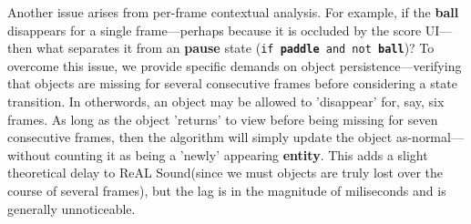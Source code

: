 \documentclass{report}
\newcommand{\rs}{ReAL Sound\xspace}
\newcommand{\state}[1]{\textbf{#1}}
\newcommand{\pad}{\textbf{paddle}\xspace}
\newcommand{\ball}{\textbf{ball}\xspace}
\begin{document}
Another issue arises from per-frame contextual analysis. For example, if the \ball disappears for a single frame---perhaps because it is occluded by the score UI---then what separates it from an \state{pause} state (\texttt{if \pad and not \ball})? To overcome this issue, we provide specific demands on object persistence---verifying that objects are missing for several consecutive frames before considering a state transition. In otherwords, an object may be allowed to 'disappear' for, say, six frames. As long as the object 'returns' to view before being missing for seven consecutive frames, then the algorithm will simply update the object as-normal---without counting it as being a 'newly' appearing \state{entity}. This adds a slight theoretical delay to \rs (since we must objects are truly lost over the course of several frames), but the lag is in the magnitude of miliseconds and is generally unnoticeable.
\end{document}
